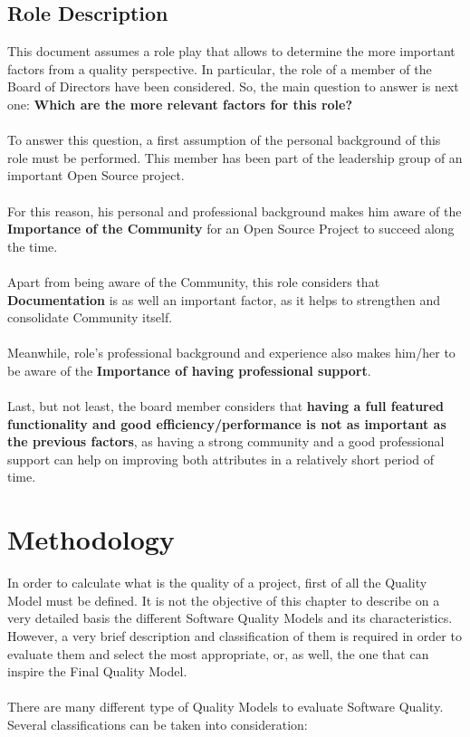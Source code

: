 \documentclass[11pt]{article}
\begin{document}
\begin{itemize}
\subsection{Role Description} \label{sec:roledesc}
This document assumes a role play that allows to determine the more important factors from a quality perspective. In particular, the role of a member of the Board of Directors have been considered. So, the main question to answer is next one: \textbf{Which are the more relevant factors for this role?}\\
\\
To answer this question, a first assumption of the personal background of this role must be performed. This member has been part of the leadership group of an important Open Source project.\\
\\
For this reason, his personal and professional background makes him aware of the \textbf{Importance of the Community} for an Open Source Project to succeed along the time.\\
\\
Apart from being aware of the Community, this role considers that \textbf{Documentation} is as well an important factor, as it helps to strengthen and consolidate Community itself.\\
\\
Meanwhile, role's professional background and experience also makes him/her to be aware of the \textbf{Importance of having professional support}.\\
\\
Last, but not least, the board member considers that \textbf{having a full featured functionality and good efficiency/performance is not as important as the previous factors}, as having a strong community and a good professional support can help on improving both attributes in a relatively short period of time.
\end{itemize}

\section{Methodology} \label{sec:methodology}
In order to calculate what is the quality of a project, first of all the Quality Model must be defined. It is not the objective of this chapter to describe on a very detailed basis the different Software Quality Models and its characteristics. However, a very brief description and classification of them is required in order to evaluate them and select the most appropriate, or, as well, the one that can inspire the Final Quality Model.\\
\\
There are many different type of Quality Models to evaluate Software Quality. Several classifications can be taken into consideration:
\end{document}
